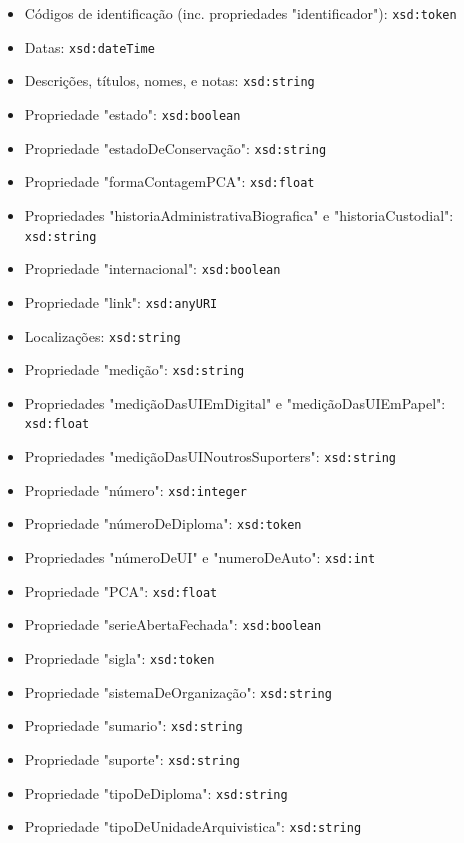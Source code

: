 \documentclass{article}
\begin{document}
\begin{itemize}
    \item Códigos de identificação (inc. propriedades "identificador"): \texttt{xsd:token}
    \item Datas: \texttt{xsd:dateTime}
    \item Descrições, títulos, nomes, e notas: \texttt{xsd:string}
    \item Propriedade "estado": \texttt{xsd:boolean}
    \item Propriedade "estadoDeConservação": \texttt{xsd:string}
    \item Propriedade "formaContagemPCA": \texttt{xsd:float}
    \item Propriedades "historiaAdministrativaBiografica" e "historiaCustodial": \texttt{xsd:string}
    \item Propriedade "internacional": \texttt{xsd:boolean}
    \item Propriedade "link": \texttt{xsd:anyURI}
    \item Localizações: \texttt{xsd:string}
    \item Propriedade "medição": \texttt{xsd:string}
    \item Propriedades "mediçãoDasUIEmDigital" e "mediçãoDasUIEmPapel": \texttt{xsd:float}
    \item Propriedades "mediçãoDasUINoutrosSuporters": \texttt{xsd:string}
    \item Propriedade "número": \texttt{xsd:integer}
    \item Propriedade "númeroDeDiploma": \texttt{xsd:token}
    \item Propriedades "númeroDeUI" e "numeroDeAuto": \texttt{xsd:int}
    \item Propriedade "PCA": \texttt{xsd:float}
    \item Propriedade "serieAbertaFechada": \texttt{xsd:boolean}
    \item Propriedade "sigla": \texttt{xsd:token}
    \item Propriedade "sistemaDeOrganização": \texttt{xsd:string}
    \item Propriedade "sumario": \texttt{xsd:string}
    \item Propriedade "suporte": \texttt{xsd:string}
    \item Propriedade "tipoDeDiploma": \texttt{xsd:string}
    \item Propriedade "tipoDeUnidadeArquivistica": \texttt{xsd:string}
\end{itemize}
\end{document}
